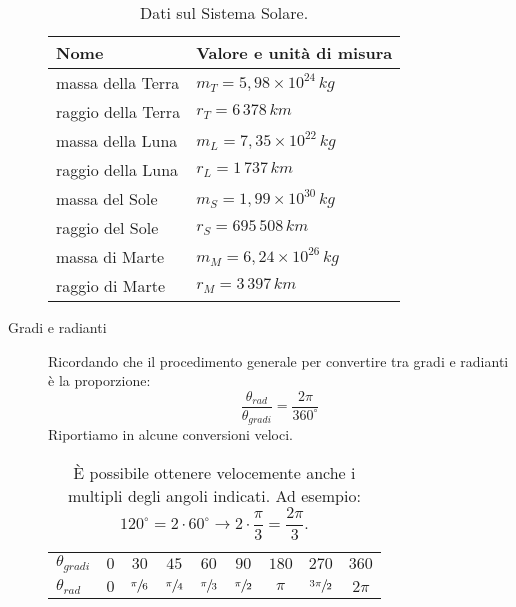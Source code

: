 \documentclass[a4paper,11pt,italian]{article}
\begin{document}
\begin{description}
  \begin{table}[htp]\centering
    \begin{tabular}{ll}\toprule
      \textbf{Nome} & \textbf{Valore e unità di misura}\\\midrule
      massa della Terra & $ m_T = 5,98 \times 10^{24} \, kg	$ \\\addlinespace[.2em]
      raggio della Terra & $ r_T = 6 \, 378 \, km $ \\\addlinespace[.2em]
      massa della Luna & $ m_L = 7,35 \times 10^{22} \, kg $ \\\addlinespace[.2em]
      raggio della Luna & $ r_L = 1 \, 737 \, km $ \\\addlinespace[.2em]
      massa del Sole & $ m_S = 1,99 \times 10^{30} \, kg $ \\\addlinespace[.2em]
      raggio del Sole & $ r_S = 695 \, 508 \, km $ \\\addlinespace[.2em]
      massa di Marte & $ m_M = 6,24 \times 10^{26} \, kg $ \\\addlinespace[.2em]
      raggio di Marte & $ r_M = 3 \, 397 \, km $ \\\bottomrule
    \end{tabular}
  \caption{Dati sul Sistema Solare.}
    \label{tab:datisistemasolare}
  \end{table}  

  \item[Gradi e radianti] Ricordando che il procedimento generale per convertire tra gradi e radianti è la proporzione:
  \[ \frac{\theta_{rad}}{\theta_{gradi}} = \frac{2\pi}{360^{\circ}} \]
  Riportiamo in  alcune conversioni veloci.
  \begin{table}[htp]\centering
    \begin{tabular}{lcccccccc}\toprule
        \boldmath$ \theta_{gradi} $ & $ 0 $ & $ 30 $ & $ 45 $ & $ 60 $ & $ 90 $ & $ 180 $ & $ 270 $ & $ 360 $\\\addlinespace[.2em]\midrule
        \boldmath$ \theta_{rad} $ & $ 0 $ & $ \sfrac{\pi}{6} $ & $ \sfrac{\pi}{4} $ & $ \sfrac{\pi}{3} $ & $ \sfrac{\pi}{2} $ & $ \pi $ & $ \sfrac{3\pi}{2} $ & $ 2\pi $\\\bottomrule
    \end{tabular}
    \caption{È possibile ottenere velocemente anche i multipli degli angoli indicati. Ad esempio: $ 120^{\circ} = 2\cdot 60^{\circ} \rightarrow 2 \cdot \dfrac{\pi}{3} = \dfrac{2\pi}{3} $.}\label{tab:gradiradianti}
  \end{table}
\end{description}
\end{document}
